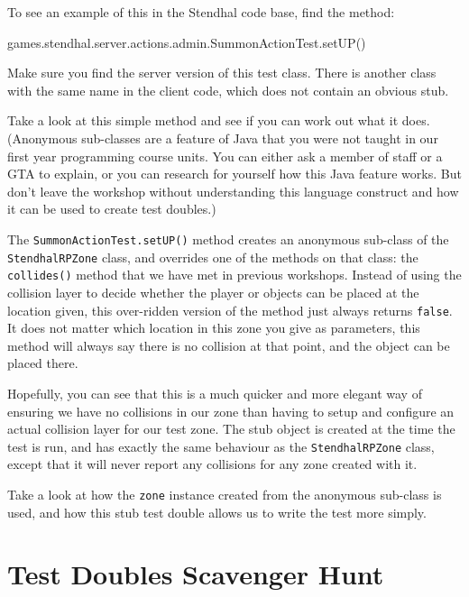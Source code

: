 \documentclass[
]{book}
\newenvironment{Shaded}{\begin{snugshade}}{\end{snugshade}}
\newcommand{\FunctionTok}[1]{\textcolor[rgb]{0.00,0.00,0.00}{#1}}
\newcommand{\NormalTok}[1]{#1}
\begin{document}
To see an example of this in the Stendhal code base, find the method:

\begin{Shaded}
\begin{Highlighting}[]
\NormalTok{games.}\FunctionTok{stendhal}\NormalTok{.}\FunctionTok{server}\NormalTok{.}\FunctionTok{actions}\NormalTok{.}\FunctionTok{admin}\NormalTok{.}\FunctionTok{SummonActionTest}\NormalTok{.}\FunctionTok{setUP}\NormalTok{()}
\end{Highlighting}
\end{Shaded}

Make sure you find the server version of this test class. There is another class with the same name in the client code, which does not contain an obvious stub.

Take a look at this simple method and see if you can work out what it does. (Anonymous sub-classes are a feature of Java that you were not taught in our first year programming course units. You can either ask a member of staff or a GTA to explain, or you can research for yourself how this Java feature works. But don't leave the workshop without understanding this language construct and how it can be used to create test doubles.)

The \texttt{SummonActionTest.setUP()} method creates an anonymous sub-class of the \texttt{StendhalRPZone} class, and overrides one of the methods on that class: the \texttt{collides()} method that we have met in previous workshops. Instead of using the collision layer to decide whether the player or objects can be placed at the location given, this over-ridden version of the method just always returns \texttt{false}. It does not matter which location in this zone you give as parameters, this method will always say there is no collision at that point, and the object can be placed there.

Hopefully, you can see that this is a much quicker and more elegant way of ensuring we have no collisions in our zone than having to setup and configure an actual collision layer for our test zone. The stub object is created at the time the test is run, and has exactly the same behaviour as the \texttt{StendhalRPZone} class, except that it will never report any collisions for any zone created with it.

Take a look at how the \texttt{zone} instance created from the anonymous sub-class is used, and how this stub test double allows us to write the test more simply.

\hypertarget{scavenger}{%
\section{Test Doubles Scavenger Hunt}\label{scavenger}}
\end{document}
